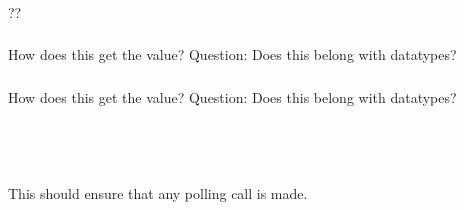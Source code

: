 \documentclass{article}
\begin{document}
\subsubsection{}
\begin{adi3}
\begin{mmadi}??
\begin{core}
\end{core}
\end{mmadi}
\end{adi3}

\subsubsection{}
How does this get the value?
Question: Does this belong with datatypes?

\subsubsection{}
How does this get the value?
Question: Does this belong with datatypes?

\subsubsection{}
\begin{adi3}
\begin{mmadi}
\begin{core}
\end{core}
\end{mmadi}
\end{adi3}

\subsubsection{}
\begin{adi3}
\begin{mmadi}\\
\\
\begin{core}
This should ensure that any polling call is made.
\end{core}
\end{mmadi}
\end{adi3}
\end{document}
